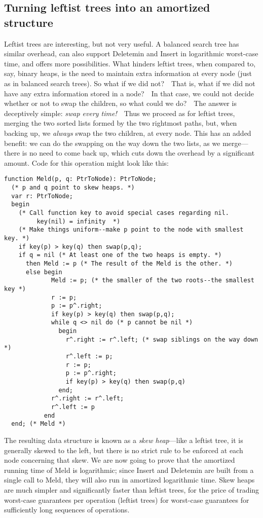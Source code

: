 \documentclass[11pt]{article}
\begin{document}
\subsection{Turning leftist trees into an amortized structure}
Leftist trees are interesting, but not very useful.  A balanced search
tree has similar overhead, can also support Deletemin and Insert in logarithmic
worst-case time, and offers more possibilities.  What hinders leftist trees,
when compared to, say, binary heaps, is the need to maintain extra information
at every node (just as in balanced search trees).  So what if we did not?\ \ 
That is, what if we did not have any extra information stored in a node?\ \ 
In that case, we could not decide whether or not to swap the children,
so what could we do?\ \ The answer is deceptively simple: \emph{swap every
time!}\ \ Thus we proceed as for leftist trees, merging the two sorted
lists formed by the two rightmost paths, but, when backing up, we \emph{always}
swap the two children, at every node.   This has an added benefit: we can
do the swapping on the way down the two lists, as we merge---there is no
need to come back up, which cuts down the overhead by a significant amount.
Code for this operation might look like this:
\begin{verbatim}
function Meld(p, q: PtrToNode): PtrToNode;
  (* p and q point to skew heaps. *)
  var r: PtrToNode;
  begin
    (* Call function key to avoid special cases regarding nil.
         key(nil) = infinity  *)
    (* Make things uniform--make p point to the node with smallest key. *)
    if key(p) > key(q) then swap(p,q);
    if q = nil (* At least one of the two heaps is empty. *)
      then Meld := p (* The result of the Meld is the other. *)
      else begin
             Meld := p; (* the smaller of the two roots--the smallest key *)
             r := p;
             p := p^.right;
             if key(p) > key(q) then swap(p,q);
             while q <> nil do (* p cannot be nil *)
               begin
                 r^.right := r^.left; (* swap siblings on the way down *)
                 r^.left := p;
                 r := p;
                 p := p^.right;
                 if key(p) > key(q) then swap(p,q)
               end;
             r^.right := r^.left;
             r^.left := p
           end
  end; (* Meld *)
\end{verbatim}
The resulting data structure is known as a \emph{skew heap}---like a leftist
tree, it is generally skewed to the left, but there is no strict rule
to be enforced at each node concerning that skew.  We are now going to prove
that the amortized running time of Meld is logarithmic; since Insert and
Deletemin are built from a single call to Meld, they will also run in
amortized logarithmic time.  Skew heaps are much simpler and significantly
faster than leftist trees, for the price of trading worst-case guarantees
per operation (leftist trees) for worst-case guarantees for sufficiently
long sequences of operations.
\end{document}
